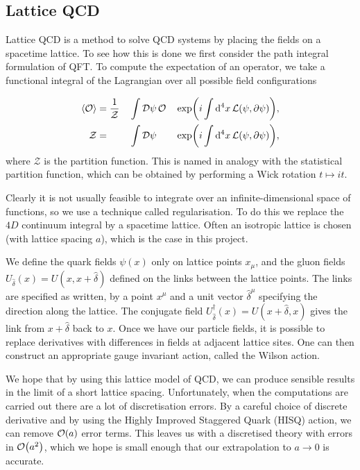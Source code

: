 \documentclass[a4paper,12pt]{article}
\begin{document}
\subsection{Lattice QCD}\label{section:lattice}
Lattice QCD is a method to solve QCD systems by placing the fields on a spacetime lattice. To see how this is done we first consider the path integral formulation of QFT\@. To compute the expectation of an operator, we take a functional integral of the Lagrangian over all possible field configurations\cite{1948Feynman, 2015Colquhoun}

\begin{alignat}{3}
    \label{eq:PathIntegral}
    \expval{\mathcal{O}} &= \dfrac{1}{\mathcal{Z}}&&\int\mathinner{\operatorname{\mathrm{\mathcal{D}}}\!\psi} \mathcal{O}  &&\exp(i \int \dd[4]{x} \mathcal{L}(\psi, \partial \psi)), \\
    \mathcal{Z}          &=                       &&\int\mathinner{\operatorname{\mathrm{\mathcal{D}}}\!\psi}              &&\exp(i \int \dd[4]{x} \mathcal{L}(\psi, \partial \psi)),
\end{alignat}
where $\mathcal{Z}$ is the partition function. This is named in analogy with the statistical partition function, which can be obtained by performing a Wick rotation $t \mapsto it$.

Clearly it is not usually feasible to integrate over an infinite-dimensional space of functions, so we use a technique called regularisation. To do this we replace the $4D$ continuum integral by a spacetime lattice. Often an isotropic lattice is chosen (with lattice spacing $a$), which is the case in this project. 

We define the quark fields\cite{2015Colquhoun} $\psi(x)$ only on lattice points $x_\mu$, and the gluon fields $U_{\hat{\delta}}(x) = U(x, x + \hat{\delta})$ defined on the links between the lattice points. The links are specified as written, by a point $x^\mu$ and a unit vector $\hat{\delta}^\mu$ specifying the direction along the lattice. The conjugate field $U^\dagger_{\hat{\delta}}(x) = U(x + \hat{\delta}, x)$ gives the link from $x+\hat{\delta}$ back to $x$. Once we have our particle fields, it is possible to replace derivatives with differences in fields at adjacent lattice sites. One can then construct an appropriate gauge invariant action, called the Wilson action.

We hope that by using this lattice model of QCD, we can produce sensible results in the limit of a short lattice spacing. Unfortunately, when the computations are carried out there are a lot of discretisation errors\cite{2009LatticeDiscretization}. By a careful choice of discrete derivative and by using the Highly Improved Staggered Quark (HISQ) action, we can remove $\order{a}$ error terms. This leaves us with a discretised theory with errors in $\order{a^2}$, which we hope is small enough that our extrapolation to $a \rightarrow 0$ is accurate.
\end{document}
